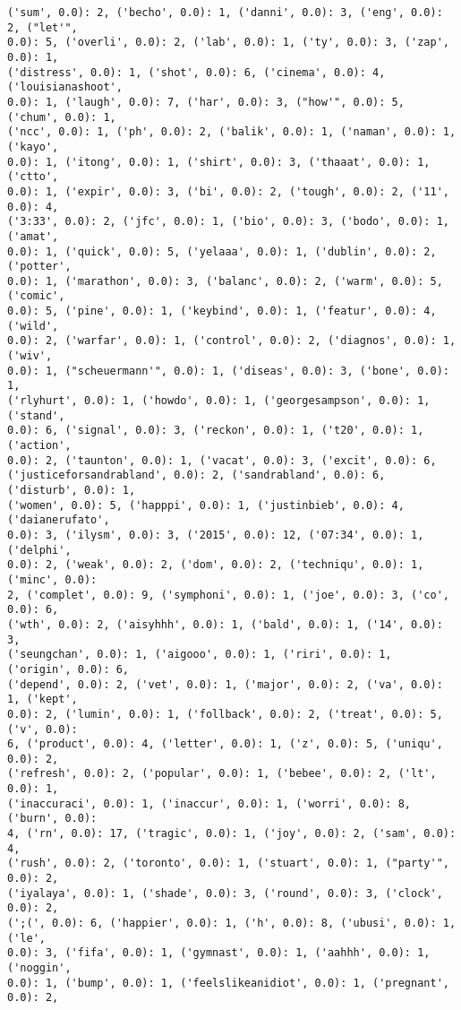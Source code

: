 \documentclass[11pt]{article}
\begin{document}
\begin{Verbatim}[commandchars=\\\{\}]
('sum', 0.0): 2, ('becho', 0.0): 1, ('danni', 0.0): 3, ('eng', 0.0): 2, ("let'",
0.0): 5, ('overli', 0.0): 2, ('lab', 0.0): 1, ('ty', 0.0): 3, ('zap', 0.0): 1,
('distress', 0.0): 1, ('shot', 0.0): 6, ('cinema', 0.0): 4, ('louisianashoot',
0.0): 1, ('laugh', 0.0): 7, ('har', 0.0): 3, ("how'", 0.0): 5, ('chum', 0.0): 1,
('ncc', 0.0): 1, ('ph', 0.0): 2, ('balik', 0.0): 1, ('naman', 0.0): 1, ('kayo',
0.0): 1, ('itong', 0.0): 1, ('shirt', 0.0): 3, ('thaaat', 0.0): 1, ('ctto',
0.0): 1, ('expir', 0.0): 3, ('bi', 0.0): 2, ('tough', 0.0): 2, ('11', 0.0): 4,
('3:33', 0.0): 2, ('jfc', 0.0): 1, ('bio', 0.0): 3, ('bodo', 0.0): 1, ('amat',
0.0): 1, ('quick', 0.0): 5, ('yelaaa', 0.0): 1, ('dublin', 0.0): 2, ('potter',
0.0): 1, ('marathon', 0.0): 3, ('balanc', 0.0): 2, ('warm', 0.0): 5, ('comic',
0.0): 5, ('pine', 0.0): 1, ('keybind', 0.0): 1, ('featur', 0.0): 4, ('wild',
0.0): 2, ('warfar', 0.0): 1, ('control', 0.0): 2, ('diagnos', 0.0): 1, ('wiv',
0.0): 1, ("scheuermann'", 0.0): 1, ('diseas', 0.0): 3, ('bone', 0.0): 1,
('rlyhurt', 0.0): 1, ('howdo', 0.0): 1, ('georgesampson', 0.0): 1, ('stand',
0.0): 6, ('signal', 0.0): 3, ('reckon', 0.0): 1, ('t20', 0.0): 1, ('action',
0.0): 2, ('taunton', 0.0): 1, ('vacat', 0.0): 3, ('excit', 0.0): 6,
('justiceforsandrabland', 0.0): 2, ('sandrabland', 0.0): 6, ('disturb', 0.0): 1,
('women', 0.0): 5, ('happpi', 0.0): 1, ('justinbieb', 0.0): 4, ('daianerufato',
0.0): 3, ('ilysm', 0.0): 3, ('2015', 0.0): 12, ('07:34', 0.0): 1, ('delphi',
0.0): 2, ('weak', 0.0): 2, ('dom', 0.0): 2, ('techniqu', 0.0): 1, ('minc', 0.0):
2, ('complet', 0.0): 9, ('symphoni', 0.0): 1, ('joe', 0.0): 3, ('co', 0.0): 6,
('wth', 0.0): 2, ('aisyhhh', 0.0): 1, ('bald', 0.0): 1, ('14', 0.0): 3,
('seungchan', 0.0): 1, ('aigooo', 0.0): 1, ('riri', 0.0): 1, ('origin', 0.0): 6,
('depend', 0.0): 2, ('vet', 0.0): 1, ('major', 0.0): 2, ('va', 0.0): 1, ('kept',
0.0): 2, ('lumin', 0.0): 1, ('follback', 0.0): 2, ('treat', 0.0): 5, ('v', 0.0):
6, ('product', 0.0): 4, ('letter', 0.0): 1, ('z', 0.0): 5, ('uniqu', 0.0): 2,
('refresh', 0.0): 2, ('popular', 0.0): 1, ('bebee', 0.0): 2, ('lt', 0.0): 1,
('inaccuraci', 0.0): 1, ('inaccur', 0.0): 1, ('worri', 0.0): 8, ('burn', 0.0):
4, ('rn', 0.0): 17, ('tragic', 0.0): 1, ('joy', 0.0): 2, ('sam', 0.0): 4,
('rush', 0.0): 2, ('toronto', 0.0): 1, ('stuart', 0.0): 1, ("party'", 0.0): 2,
('iyalaya', 0.0): 1, ('shade', 0.0): 3, ('round', 0.0): 3, ('clock', 0.0): 2,
(';(', 0.0): 6, ('happier', 0.0): 1, ('h', 0.0): 8, ('ubusi', 0.0): 1, ('le',
0.0): 3, ('fifa', 0.0): 1, ('gymnast', 0.0): 1, ('aahhh', 0.0): 1, ('noggin',
0.0): 1, ('bump', 0.0): 1, ('feelslikeanidiot', 0.0): 1, ('pregnant', 0.0): 2,

\end{Verbatim}
\end{document}
